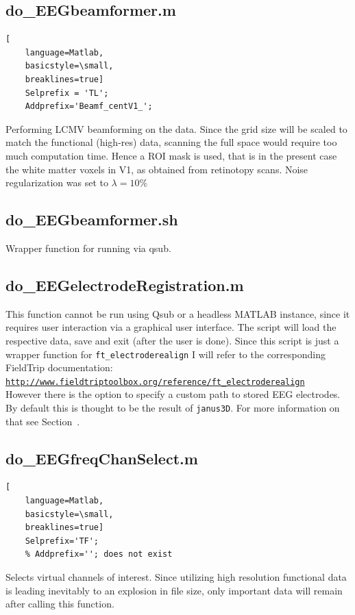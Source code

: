 \documentclass[12pt,a4paper]{scrartcl}
\begin{document}
\subsection{do\_EEGbeamformer.m}
\label{m:beamf}
\begin{lstlisting}[
    language=Matlab,
    basicstyle=\small,
    breaklines=true]
    Selprefix = 'TL';
    Addprefix='Beamf_centV1_';
\end{lstlisting}
Performing LCMV beamforming on the data. Since the grid size will be scaled to match the functional (high-res) data, scanning the full space would require too much computation time. Hence a ROI mask is used, that is in the present case the white matter voxels in V1, as obtained from retinotopy scans. Noise regularization was set to $\lambda=10\%$\\

\subsection{do\_EEGbeamformer.sh}
\label{sh:beamf}
Wrapper function for running \texttt{} via qsub.\\

\subsection{do\_EEGelectrodeRegistration.m}
\label{m:elecReg}
This function cannot be run using Qsub or a headless MATLAB instance, since it requires user interaction via a graphical user interface. The script will load the respective data, save and exit (after the user is done). Since this script is just a wrapper function for \texttt{ft\_electroderealign} I will refer to the corresponding FieldTrip documentation: \href{http://www.fieldtriptoolbox.org/reference/ft\_electroderealign}{\nolinkurl{http://www.fieldtriptoolbox.org/reference/ft\_electroderealign}}\\

\noindent However there is the option to specify a custom path to stored EEG electrodes. By default this is thought to be the result of \texttt{janus3D}. For more information on that see Section~.

\subsection{do\_EEGfreqChanSelect.m}
\label{m:selchan}
\begin{lstlisting}[
    language=Matlab,
    basicstyle=\small,
    breaklines=true]
    Selprefix='TF';
    % Addprefix=''; does not exist
\end{lstlisting}
Selects virtual channels of interest. Since utilizing high resolution functional data is leading inevitably to an explosion in file size, only important data will remain after calling this function.\\
\end{document}
